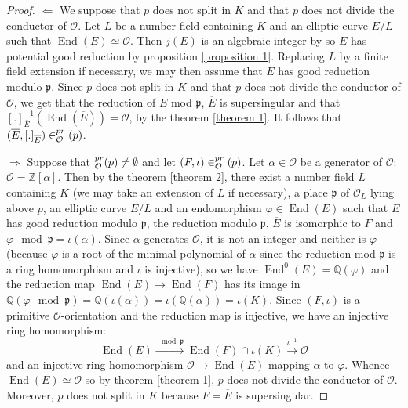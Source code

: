 \documentclass[a4paper,10pt]{report}
\theoremstyle{definition}
\theoremstyle{plain}
\theoremstyle{definition}
\newcommand{\Z}{\mathbb{Z}}
\newcommand{\Q}{\mathbb{Q}}
\newcommand{\mO}{\mathcal{O}}
\renewcommand{\(}{\left(}
\renewcommand{\)}{\right)}
\newcommand{\mfp}{\mathfrak{p}}
\DeclareMathOperator{\End}{End}
\let\SS\relax
\DeclareMathOperator{\SS}{SS}
\begin{document}
\begin{proof}
$\Longleftarrow$ We suppose that $p$ does not split in $K$ and that $p$ does not divide the conductor of $\mO$.  Let $L$ be a number field containing $K$ and an elliptic curve $E/L$ such that $\End(E)\simeq \mO$. Then $j(E)$ is an algebraic integer by \cite[theorem II.6.1]{Silverman2} so $E$ has potential good reduction by proposition \ref{proposition 1}. Replacing $L$ by a finite field extension if necessary, we may then assume that $E$ has good reduction modulo $\mfp$.  Since $p$ does not split in $K$ and that $p$ does not divide the conductor of $\mO$, we get that the reduction of $E$ mod $\mfp$, $\overline{E}$ is supersingular and that $[.]_{\overline{E}}^{-1}(\End(\overline{E}))=\mO$, by the theorem \ref{theorem 1}. It follows that $(\overline{E}, [.]_{\overline{E}})\in\SS_{\mO}^{pr}(p)$.

$\Longrightarrow$ Suppose that $\SS_{\mO}^{pr}(p)\neq\emptyset$ and let $(F,\iota)\in\SS_{\mO}^{pr}(p)$. Let $\alpha\in \mO$ be a generator of $\mO$: $\mO=\Z[\alpha]$. Then by the theorem \ref{theorem 2}, there exist a number field $L$ containing $K$ (we may take an extension of $L$ if necessary), a place $\mfp$ of $\mO_L$ lying above $p$, an elliptic curve $E/L$ and an endomorphism $\varphi\in\End(E)$ such that $E$ has good reduction modulo $\mfp$, the reduction modulo $\mfp$,  $\overline{E}$ is isomorphic to $F$ and $\varphi \mod \mfp= \iota(\alpha)$.  Since $\alpha$ generates $\mO$, it is not an integer and neither is $\varphi$ (because $\varphi$ is a root of the minimal polynomial of $\alpha$ since the reduction mod $\mfp$ is a ring homomorphism and $\iota$ is injective), so we have $\End^0(E)=\Q(\varphi)$ and the reduction map $\End(E)\longrightarrow\End(F)$ has its image in $\Q(\varphi \mod \mfp)=\Q(\iota(\alpha))=\iota(\Q(\alpha))=\iota(K)$.  Since $(F,\iota)$ is a primitive $\mO$-orientation and the reduction map is injective, we have an injective ring homomorphism:
\[\End(E)\overset{\mod \mfp}{\longrightarrow}\End(F)\cap\iota(K)\overset{\iota^{-1}}{\longrightarrow}\mO\]
and an injective ring homomorphism $\mO\longrightarrow\End(E)$ mapping $\alpha$ to $\varphi$. Whence $\End(E)\simeq \mO$ so by theorem \ref{theorem 1}, $p$ does not divide the conductor of $\mO$.  Moreover, $p$ does not split in $K$ because $F=\overline{E}$ is supersingular.
\end{proof}
\end{document}
